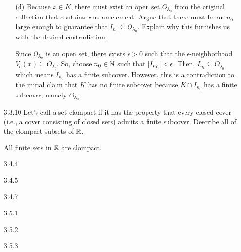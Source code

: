 \documentclass[12pt,letterpaper]{article}
\begin{document}
\begin{itemize}[leftmargin=!,labelindent=5pt]
\begin{itemize}
                \item [(d)] Because $x \in K$, there must exist an open set $O_{\lambda_0}$ from the original collection that contains $x$ as an element. Argue that there must be an $n_0$ large enough to guarantee that $I_{n_0} \subseteq O_{\lambda_0}$. Explain why this furnishes us with the desired contradiction.
                
                    Since $O_{\lambda_0}$ is an open set, there exists $\epsilon > 0$ such that the $\epsilon$-neighborhood $V_\epsilon(x) \subseteq O_{\lambda_0}$.
                    So, choose $n_0 \in \mathbb{N}$ such that $\abs{I_{n_0}} < \epsilon$.
                    Then, $I_{n_0} \subseteq O_{\lambda_0}$ which means $I_{n_0}$ has a finite subcover.
                    However, this is a contradiction to the initial claim that $K$ has no finite subcover
                    because $K \cap I_{n_0}$ has a finite subcover, namely $O_{\lambda_0}$.
            \end{itemize}
        \item [3.3.10] Let’s call a set clompact if it has the property that every closed cover (i.e., a cover consisting of closed sets) admits a finite subcover. Describe all of the clompact subsets of $\mathbb{R}$.
            
            All finite sets in $\mathbb{R}$ are clompact.
        \item [3.4.4] 
        \item [3.4.5] 
        \item [3.4.7] 
        \item [3.5.1] 
        \item [3.5.2]
        \item [3.5.3]
    \end{itemize}
\end{document}
